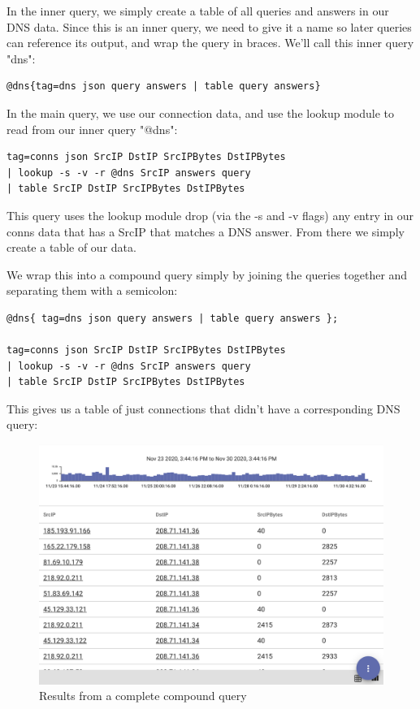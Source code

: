 In the inner query, we simply create a table of all queries and answers in our
DNS data. Since this is an inner query, we need to give it a name so later
queries can reference its output, and wrap the query in braces. We'll call this
inner query "dns":

\begin{verbatim}
@dns{tag=dns json query answers | table query answers} 
\end{verbatim}

In the main query, we use our connection data, and use the lookup module to
read from our inner query "@dns":

\begin{verbatim}
tag=conns json SrcIP DstIP SrcIPBytes DstIPBytes 
| lookup -s -v -r @dns SrcIP answers query 
| table SrcIP DstIP SrcIPBytes DstIPBytes 
\end{verbatim}

This query uses the lookup module drop (via the -s and -v flags) any entry in
our conns data that has a SrcIP that matches a DNS answer. From there we simply
create a table of our data.

We wrap this into a compound query simply by joining the queries together and
separating them with a semicolon:

\begin{verbatim}
@dns{ tag=dns json query answers | table query answers };

tag=conns json SrcIP DstIP SrcIPBytes DstIPBytes 
| lookup -s -v -r @dns SrcIP answers query 
| table SrcIP DstIP SrcIPBytes DstIPBytes 
\end{verbatim}

This gives us a table of just connections that didn't have a corresponding DNS
query:

\begin{figure}[H]
	\includegraphics[width=0.6\linewidth]{images/compound-table2.png}
	\caption{Results from a complete compound query}
	\label{fig:compound-table2}
\end{figure}


